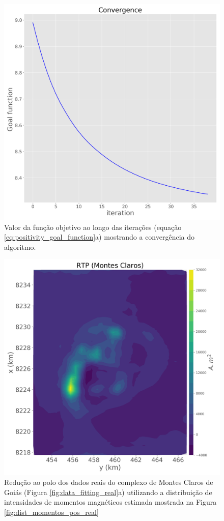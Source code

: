 \begin{figure}
	\centering
	\includegraphics[width=.9\textwidth]{Fig/eqlayer/field_data_montes_claros/convergence_LM_NNLS_montesclaros.png}
	\caption{Valor da função objetivo ao longo das iterações (equação \ref{eq:positivity_goal_function}a) mostrando a convergência do algoritmo.}
	\label{fig:convergence_real}
\end{figure}

\begin{figure}
	\centering
	\includegraphics[width=.9\textwidth]{Fig/eqlayer/field_data_montes_claros/RTP_data_montes_claros.png}
	\caption{Redução ao polo dos dados reais do complexo de Montes Claros de Goiás (Figura \ref{fig:data_fitting_real}a) utilizando a 
	distribuição de intensidades de momentos magnéticos estimada mostrada na Figura \ref{fig:dist_momentos_pos_real}}
	\label{fig:rtp_mc_data}
\end{figure}

